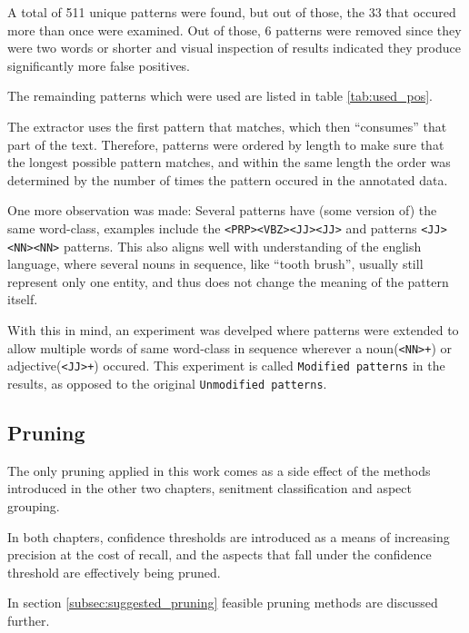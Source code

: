 \documentclass[a4paper,11pt]{kth-mag}
\begin{document}
A total of 511 unique patterns were found, but out of those, the 33 that occured more than
once were examined. Out of those, 6 patterns were removed since they were two words or shorter
and visual inspection of results indicated they produce significantly more false positives.

The remainding patterns which were used are listed in table \ref{tab:used_pos}.

The extractor uses the first pattern that matches, which then ``consumes'' that part of the text.
Therefore, patterns were ordered by length to make sure that the longest possible pattern
matches, and within the same length the order was determined by
the number of times the pattern occured in the annotated data.

One more observation was made: Several patterns have (some version of) the same word-class,
examples include the \texttt{<PRP><VBZ><JJ><JJ>} and patterns \texttt{<JJ><NN><NN>} patterns.
This also aligns well with understanding of the english language, where several nouns in sequence,
like ``tooth brush'', usually still represent only one entity, and thus does not change
the meaning of the pattern itself.

With this in mind, an experiment was develped where patterns were extended to allow
multiple words of same word-class in sequence wherever a noun(\texttt{<NN>+})
or adjective(\texttt{<JJ>+}) occured.
This experiment is called \texttt{Modified patterns} in the results, as opposed to
the original \texttt{Unmodified patterns}.

\subsection{Pruning}
The only pruning applied in this work comes as a side effect of the methods introduced
in the other two chapters, senitment classification and aspect grouping.

In both chapters, confidence thresholds are introduced as a means of increasing
precision at the cost of recall, and the aspects that fall under the confidence threshold
are effectively being pruned.

In section \ref{subsec:suggested_pruning} feasible pruning methods are discussed further.


\newcommand{\ExtrPatOne}{\texttt{<NNS?><VB.?>+<JJ.?>+}}
\newcommand{\ExtrPatTwo}{\texttt{<NNS?><VB.?>+<RB.?><JJ.?>}}
\end{document}
